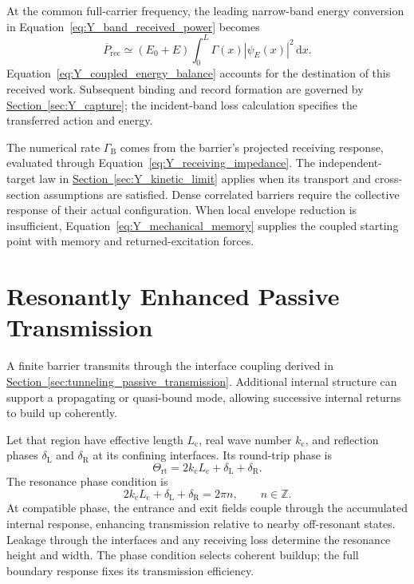 At the common full-carrier frequency, the leading narrow-band energy conversion in Equation~\eqref{eq:Y_band_received_power} becomes
\begin{equation}
    \overline P_{\mathrm{rec}}
    \simeq(E_0+E)
    \int_0^L\Gamma(x)|\psi_E(x)|^2\,\mathrm dx.
\end{equation}
Equation~\eqref{eq:Y_coupled_energy_balance} accounts for the destination of this received work. Subsequent binding and record formation are governed by \hyperref[sec:Y_capture]{Section~\ref*{sec:Y_capture}}; the incident-band loss calculation specifies the transferred action and energy.

The numerical rate $\Gamma_{\mathrm B}$ comes from the barrier's projected receiving response, evaluated through Equation~\eqref{eq:Y_receiving_impedance}. The independent-target law in \hyperref[sec:Y_kinetic_limit]{Section~\ref*{sec:Y_kinetic_limit}} applies when its transport and cross-section assumptions are satisfied. Dense correlated barriers require the collective response of their actual configuration. When local envelope reduction is insufficient, Equation~\eqref{eq:Y_mechanical_memory} supplies the coupled starting point with memory and returned-excitation forces.

\section{Resonantly Enhanced Passive Transmission}
\label{sec:tunneling_resonant_transmission}

A finite barrier transmits through the interface coupling derived in \hyperref[sec:tunneling_passive_transmission]{Section~\ref*{sec:tunneling_passive_transmission}}. Additional internal structure can support a propagating or quasi-bound mode, allowing successive internal returns to build up coherently.

Let that region have effective length $L_{\mathrm c}$, real wave number $k_{\mathrm c}$, and reflection phases $\delta_{\mathrm L}$ and $\delta_{\mathrm R}$ at its confining interfaces. Its round-trip phase is
\begin{equation}
    \Theta_{\mathrm{rt}}
    =2k_{\mathrm c}L_{\mathrm c}+\delta_{\mathrm L}+\delta_{\mathrm R}.
\end{equation}
The resonance phase condition is
\begin{equation}
    \boxed{
    2k_{\mathrm c}L_{\mathrm c}+\delta_{\mathrm L}+\delta_{\mathrm R}
    =2\pi n
    },\qquad n\in\mathbb Z.
    \label{eq:tunneling_resonance_condition}
\end{equation}
At compatible phase, the entrance and exit fields couple through the accumulated internal response, enhancing transmission relative to nearby off-resonant states. Leakage through the interfaces and any receiving loss determine the resonance height and width. The phase condition selects coherent buildup; the full boundary response fixes its transmission efficiency.

